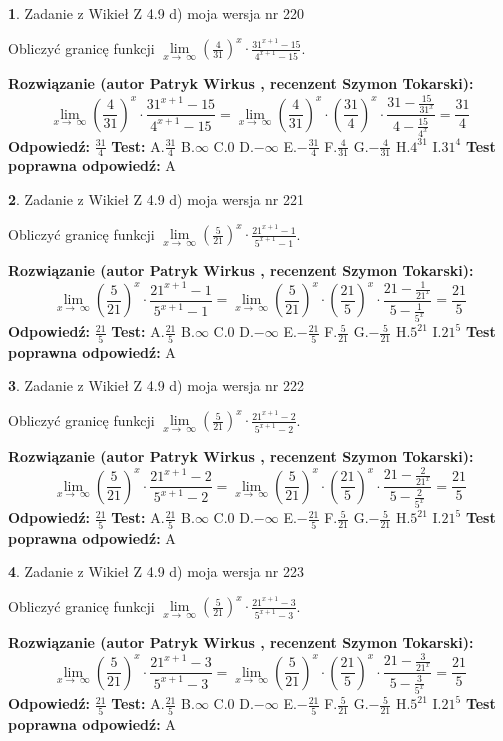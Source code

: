 \documentclass[12pt, a4paper]{article}
\theoremstyle{definition} %
\newtheorem{zad}{}
\newcommand{\zadStart}[1]{\begin{zad}#1\newline}
\newcommand{\zadStop}{\end{zad}}
\newcommand{\rozwStart}[2]{\noindent \textbf{Rozwiązanie (autor #1 , recenzent #2): }\newline}
\newcommand{\rozwStop}{\newline}
\newcommand{\odpStart}{\noindent \textbf{Odpowiedź:}\newline}
\newcommand{\odpStop}{\newline}
\newcommand{\testStart}{\noindent \textbf{Test:}\newline}
\newcommand{\testStop}{\newline}
\newcommand{\kluczStart}{\noindent \textbf{Test poprawna odpowiedź:}\newline}
\newcommand{\kluczStop}{\newline}
\begin{document}
\zadStart{Zadanie z Wikieł Z 4.9 d) moja wersja nr 220}


Obliczyć granicę funkcji  $\lim\limits_{x\to\ \infty}(\frac{4}{31})^{x}\cdot\frac{31^{x+1}-15}{4^{x+1}-15}$.
\zadStop
\rozwStart{Patryk Wirkus}{Szymon Tokarski}
$$\lim\limits_{x\to\ \infty}(\frac{4}{31})^{x}\cdot\frac{31^{x+1}-15}{4^{x+1}-15}=\lim\limits_{x\to\ \infty}(\frac{4}{31})^{x}\cdot(\frac{31}{4})^{x} \cdot \frac{31-\frac{15}{31^{x}}}{4-\frac{15}{4^{x}}} = \frac{31}{4}$$
\rozwStop
\odpStart
$\frac{31}{4}$
\odpStop
\testStart
A.$\frac{31}{4}$ B.$\infty$ C.$0$ D.$-\infty$ E.$-\frac{31}{4}$
F.$\frac{4}{31}$ G.$-\frac{4}{31}$
H.$4^{31}$
I.$31^{4}$
\testStop
\kluczStart
A
\kluczStop



\zadStart{Zadanie z Wikieł Z 4.9 d) moja wersja nr 221}


Obliczyć granicę funkcji  $\lim\limits_{x\to\ \infty}(\frac{5}{21})^{x}\cdot\frac{21^{x+1}-1}{5^{x+1}-1}$.
\zadStop
\rozwStart{Patryk Wirkus}{Szymon Tokarski}
$$\lim\limits_{x\to\ \infty}(\frac{5}{21})^{x}\cdot\frac{21^{x+1}-1}{5^{x+1}-1}=\lim\limits_{x\to\ \infty}(\frac{5}{21})^{x}\cdot(\frac{21}{5})^{x} \cdot \frac{21-\frac{1}{21^{x}}}{5-\frac{1}{5^{x}}} = \frac{21}{5}$$
\rozwStop
\odpStart
$\frac{21}{5}$
\odpStop
\testStart
A.$\frac{21}{5}$ B.$\infty$ C.$0$ D.$-\infty$ E.$-\frac{21}{5}$
F.$\frac{5}{21}$ G.$-\frac{5}{21}$
H.$5^{21}$
I.$21^{5}$
\testStop
\kluczStart
A
\kluczStop



\zadStart{Zadanie z Wikieł Z 4.9 d) moja wersja nr 222}


Obliczyć granicę funkcji  $\lim\limits_{x\to\ \infty}(\frac{5}{21})^{x}\cdot\frac{21^{x+1}-2}{5^{x+1}-2}$.
\zadStop
\rozwStart{Patryk Wirkus}{Szymon Tokarski}
$$\lim\limits_{x\to\ \infty}(\frac{5}{21})^{x}\cdot\frac{21^{x+1}-2}{5^{x+1}-2}=\lim\limits_{x\to\ \infty}(\frac{5}{21})^{x}\cdot(\frac{21}{5})^{x} \cdot \frac{21-\frac{2}{21^{x}}}{5-\frac{2}{5^{x}}} = \frac{21}{5}$$
\rozwStop
\odpStart
$\frac{21}{5}$
\odpStop
\testStart
A.$\frac{21}{5}$ B.$\infty$ C.$0$ D.$-\infty$ E.$-\frac{21}{5}$
F.$\frac{5}{21}$ G.$-\frac{5}{21}$
H.$5^{21}$
I.$21^{5}$
\testStop
\kluczStart
A
\kluczStop



\zadStart{Zadanie z Wikieł Z 4.9 d) moja wersja nr 223}


Obliczyć granicę funkcji  $\lim\limits_{x\to\ \infty}(\frac{5}{21})^{x}\cdot\frac{21^{x+1}-3}{5^{x+1}-3}$.
\zadStop
\rozwStart{Patryk Wirkus}{Szymon Tokarski}
$$\lim\limits_{x\to\ \infty}(\frac{5}{21})^{x}\cdot\frac{21^{x+1}-3}{5^{x+1}-3}=\lim\limits_{x\to\ \infty}(\frac{5}{21})^{x}\cdot(\frac{21}{5})^{x} \cdot \frac{21-\frac{3}{21^{x}}}{5-\frac{3}{5^{x}}} = \frac{21}{5}$$
\rozwStop
\odpStart
$\frac{21}{5}$
\odpStop
\testStart
A.$\frac{21}{5}$ B.$\infty$ C.$0$ D.$-\infty$ E.$-\frac{21}{5}$
F.$\frac{5}{21}$ G.$-\frac{5}{21}$
H.$5^{21}$
I.$21^{5}$
\testStop
\kluczStart
A
\kluczStop
\end{document}
